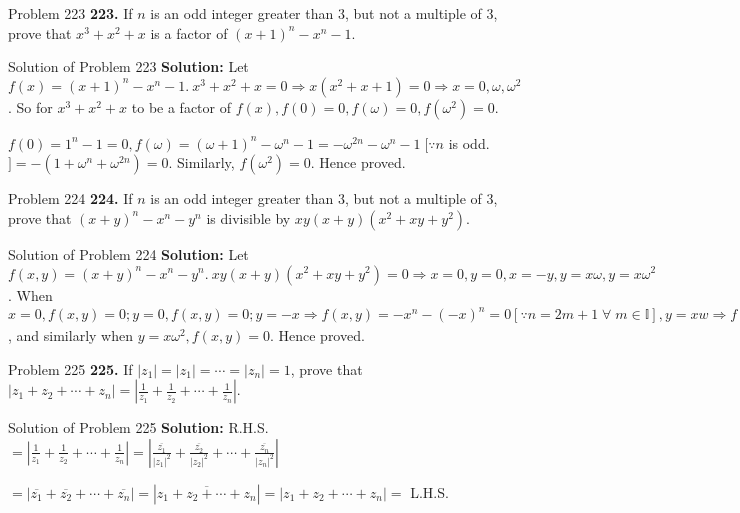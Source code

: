 \documentclass[aspectratio=169,8pt]{beamer}
\begin{document}
\begin{frame}{Problem 223}
  \textbf{223.} If $n$ is an odd integer greater than $3$, but not a multiple of $3$, prove that $x^3 + x^2
  + x$ is a factor of $(x + 1)^n - x^n - 1$.
\end{frame}
\begin{frame}{Solution of Problem 223}
  \textbf{Solution:} Let $f(x) = (x + 1)^n - x^n - 1.\ x^3 + x^2 + x = 0 \Rightarrow x(x^2 + x + 1) =
  0\Rightarrow x = 0, \omega, \omega^2$. So for $x^3 + x^2 + x$ to be a factor of $f(x), f(0) = 0, f(\omega)
  = 0, f(\omega^2) = 0$.

  $f(0) = 1^n - 1 = 0, f(\omega) = (\omega + 1)^n - \omega^n - 1 = -\omega^{2n} - \omega^n - 1\;[\because n$
  is odd. $] = -(1 + \omega^n + \omega^{2n}) = 0$. Similarly, $f(\omega^2) = 0$. Hence proved.
\end{frame}
\begin{frame}{Problem 224}
  \textbf{224.} If $n$ is an odd integer greater than $3$, but not a multiple of $3$, prove that $(x + y)^n
  - x^n - y^n$ is divisible by $xy(x + y)(x^2 + xy + y^2)$.
\end{frame}
\begin{frame}{Solution of Problem 224}
  \textbf{Solution:} Let $f(x, y) = (x + y)^n - x^n - y^n.\ xy(x + y)(x^2 + xy + y^2) = 0 \Rightarrow x = 0,
  y = 0, x = -y, y = x\omega, y = x\omega^2$. When $x = 0, f(x, y) = 0; y = 0, f(x, y) = 0; y = -x
  \Rightarrow f(x, y) = -x^n -(-x)^n = 0 [\because n = 2m + 1\;\forall\;m\in\mathbb{I}], y = xw \Rightarrow
  f(x, y) = [x^n(1 + \omega)^n - x^n - x^n\omega^n] = -x^n\omega^{2n} - x^n - x^n\omega^n = 0$, and
  similarly when $y = x\omega^2, f(x, y) = 0$. Hence proved.
\end{frame}
\begin{frame}{Problem 225}
  \textbf{225.} If $|z_1| = |z_1| = \cdots = |z_n| = 1$, prove that $|z_1 + z_2 + \cdots + z_n| =
  \left|\frac{1}{z_1} + \frac{1}{z_2} + \cdots + \frac{1}{z_n}\right|$.
\end{frame}
\begin{frame}{Solution of Problem 225}
  \textbf{Solution:} R.H.S. $= \left|\frac{1}{z_1} + \frac{1}{z_2} + \cdots + \frac{1}{z_n}\right| =
  \left|\frac{\overline{z_1}}{|z_1|^2} + \frac{\overline{z_2}}{|z_2|^2} + \cdots +
    \frac{\overline{z_n}}{|z_n|^2}\right|$

  $= |\overline{z_1} + \overline{z_2} + \cdots + \overline{z_n}| = |\overline{z_1 + z_2 + \cdots + z_n}| =
  |z_1 + z_2 + \cdots + z_n| =$ L.H.S.
\end{frame}
\end{document}
